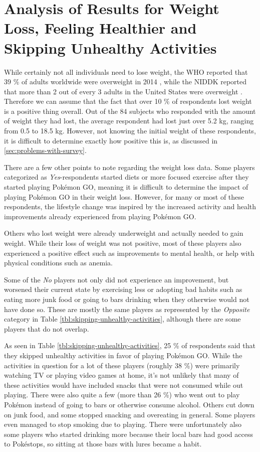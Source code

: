 \section{Analysis of Results for Weight Loss, Feeling Healthier and Skipping Unhealthy Activities}

While certainly not all individuals need to lose weight, the WHO reported that 39 \% of adults worldwide were overweight in 2014 , while the NIDDK reported that more than 2 out of every 3 adults in the United States were overweight . Therefore we can assume that the fact that over 10 \% of respondents lost weight is a positive thing overall. Out of the 84 subjects who responded with the amount of weight they had lost, the average respondent had lost just over 5.2 kg, ranging from 0.5 to 18.5 kg. However, not knowing the initial weight of these respondents, it is difficult to determine exactly how positive this is, as discussed in \ref{sec:problems-with-survey}.

There are a few other points to note regarding the weight loss data. Some players categorized as \emph{Yes}-respondents started diets or more focused exercise after they started playing Pokémon GO, meaning it is difficult to determine the impact of playing Pokémon GO in their weight loss. However, for many or most of these respondents, the lifestyle change was inspired by the increased activity and health improvements already experienced from playing Pokémon GO.

Others who lost weight were already underweight and actually needed to gain weight. While their loss of weight was not positive, most of these players also experienced a positive effect such as improvements to mental health, or help with physical conditions such as anemia.

Some of the \emph{No} players not only did not experience an improvement, but worsened their current state by exercising less or adopting bad habits such as eating more junk food or going to bars drinking when they otherwise would not have done so. These are mostly the same players as represented by the \emph{Opposite} category in Table \ref{tbl:skipping-unhealthy-activities}, although there are some players that do not overlap.

As seen in Table \ref{tbl:skipping-unhealthy-activities}, 25 \% of respondents said that they skipped unhealthy activities in favor of playing Pokémon GO. While the activities in question for a lot of these players (roughly 38 \%) were primarily watching TV or playing video games at home, it's not unlikely that many of these activities would have included snacks that were not consumed while out playing. There were also quite a few (more than 26 \%) who went out to play Pokémon instead of going to bars or otherwise consume alcohol. Others cut down on junk food, and some stopped snacking and overeating in general. Some players even managed to stop smoking due to playing. There were unfortunately also some players who started drinking more because their local bars had good access to Pokéstops, so sitting at those bars with lures became a habit. 

